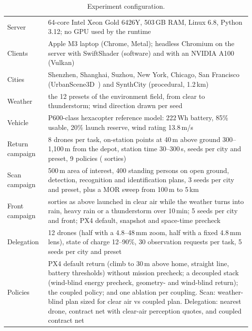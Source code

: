 \begin{table}[t]
\caption{Experiment configuration.}\label{tab:config}
\footnotesize
\begin{tabularx}{\textwidth}{@{}lX@{}}
\toprule
Server & 64-core Intel Xeon Gold 6426Y, 503\,GB RAM, Linux 6.8, Python 3.12; no GPU used by the runtime \\
Clients & Apple M3 laptop (Chrome, Metal); headless Chromium on the server with SwiftShader (software) and with an NVIDIA A100 (Vulkan) \\
Cities & Shenzhen, Shanghai, Suzhou, New York, Chicago, San Francisco (UrbanScene3D~\cite{lin2022urbanscene3d}) and SynthCity (procedural, 1.2\,km) \\
Weather & the 12 presets of the environment field, from clear to thunderstorm; wind direction drawn per seed \\
Vehicle & P600-class hexacopter reference model: 222\,Wh battery, 85\% usable, 20\% launch reserve, wind rating 13.8\,m/s \\
Return campaign & 8 drones per task, on-station points at 40\,m above ground 300--1,100\,m from the depot, station time 30--300\,s, \RTLSEEDS{} seeds per city and preset, 9 policies (\RTLSORTIES{} sorties) \\
Scan campaign & 500\,m area of interest, 400 standing persons on open ground, detection, recognition and identification plans, 3 seeds per city and preset, plus a MOR sweep from 100\,m to 5\,km \\
Front campaign & sorties as above launched in clear air while the weather turns into rain, heavy rain or a thunderstorm over 10\,min; 5 seeds per city and front; PX4 default, snapshot and space-time precheck \\
Delegation & 12 drones (half with a 4.8--48\,mm zoom, half with a fixed 4.8\,mm lens), state of charge 12--90\%, 30 observation requests per task, 5 seeds per city and preset \\
Policies & PX4 default return (climb to 30\,m above home, straight line, battery thresholds) without mission precheck; a decoupled stack (wind-blind energy precheck, geometry- and wind-blind return); the coupled policy; and one ablation per coupling. Scan: weather-blind plan sized for clear air vs coupled plan. Delegation: nearest drone, contract net with clear-air perception quotes, and coupled contract net \\
\bottomrule
\end{tabularx}
\end{table}

